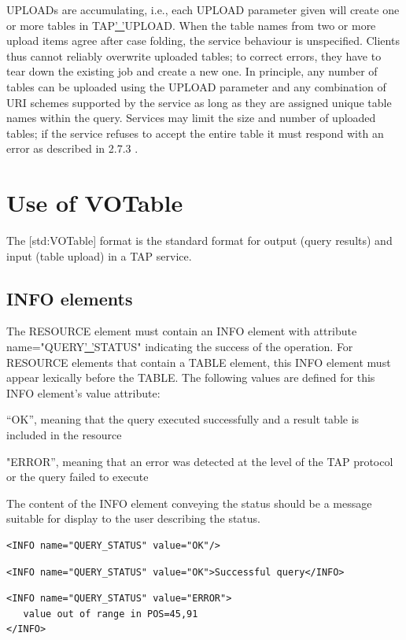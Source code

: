 \documentclass[11pt,a4paper]{ivoa}
\begin{document}
{UPLOADs are accumulating, i.e., each UPLOAD parameter given will create one or 
more tables in TAP\underline{' '}UPLOAD. When the table names from two or more 
upload items agree after case folding, the service behaviour is unspecified. 
Clients thus cannot reliably overwrite uploaded tables; to correct errors, they 
have to tear down the existing job and create a new one. In principle, any 
number of tables can be uploaded using the UPLOAD parameter and any combination 
of URI schemes supported by the service as long as they are assigned unique 
table names within the query. Services may limit the size and number of 
uploaded tables; if the service refuses to accept the entire table it must 
respond with an error as described in 2.7.3 .


\section{Use of VOTable}
The [std:VOTable] format is the standard format for output (query results) and 
input (table upload) in a TAP service. 


\subsection{INFO elements}
The RESOURCE element must contain an INFO element with attribute 
name="QUERY\underline{' '}STATUS" indicating the success of the operation. For 
RESOURCE elements that contain a TABLE element, this INFO element must appear 
lexically before the TABLE. The following values are defined for this INFO 
element's value attribute:

“OK”, meaning that the query executed successfully and a result table is 
included in the resource 

"ERROR”, meaning that an error was detected at the level of the TAP 
protocol or the query failed to execute 

The content of the INFO element conveying the status should be a message 
suitable for display to the user describing the status.

\begin{verbatim}
<INFO name="QUERY_STATUS" value="OK"/>
\end{verbatim}
 
\begin{verbatim}
<INFO name="QUERY_STATUS" value="OK">Successful query</INFO>
\end{verbatim}

\begin{verbatim}
<INFO name="QUERY_STATUS" value="ERROR">
   value out of range in POS=45,91
</INFO>
\end{verbatim}

}
\end{document}
